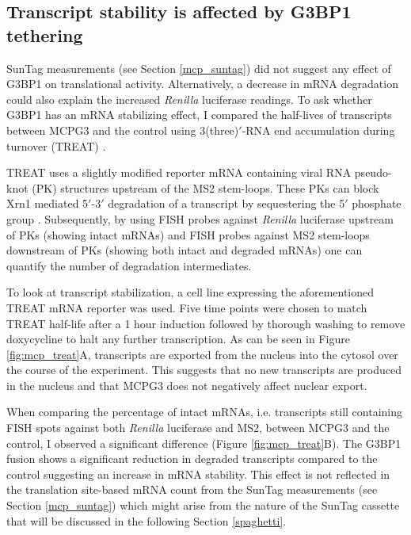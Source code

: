 \subsection{Transcript stability is affected by G3BP1 tethering} \label{mcp_treat}

SunTag measurements (see Section \ref{mcp_suntag}) did not suggest any effect of G3BP1 on translational activity.
Alternatively, a decrease in mRNA degradation could also explain the increased \textit{Renilla} luciferase readings.
To ask whether G3BP1 has an mRNA stabilizing effect, I compared the half-lives of transcripts between MCPG3 and the control using 3(three)$'$-RNA end accumulation during turnover (TREAT) \cite{horvathova_dynamics_2017}.

TREAT uses a slightly modified reporter mRNA containing viral RNA pseudo-knot (PK) structures upstream of the MS2 stem-loops.
These PKs can block Xrn1 mediated 5$'$-3$'$ degradation of a transcript by sequestering the 5$'$ phosphate group \cite{kieft_new_2015}.
Subsequently, by using FISH probes against \textit{Renilla} luciferase upstream of PKs (showing intact mRNAs) and FISH probes against MS2 stem-loops downstream of PKs (showing both intact and degraded mRNAs) one can quantify the number of degradation intermediates.

To look at transcript stabilization, a cell line expressing the aforementioned TREAT mRNA reporter was used.
Five time points were chosen to match TREAT half-life after a 1 hour induction followed by thorough washing to remove doxycycline to halt any further transcription.
As can be seen in Figure \ref{fig:mcp_treat}A, transcripts are exported from the nucleus into the cytosol over the course of the experiment.
This suggests that no new transcripts are produced in the nucleus and that MCPG3 does not negatively affect nuclear export.

When comparing the percentage of intact mRNAs, i.e. transcripts still containing FISH spots against both \textit{Renilla} luciferase and MS2, between MCPG3 and the control, I observed a significant difference (Figure \ref{fig:mcp_treat}B).
The G3BP1 fusion shows a significant reduction in degraded transcripts compared to the control suggesting an increase in mRNA stability.
This effect is not reflected in the translation site-based mRNA count from the SunTag measurements (see Section \ref{mcp_suntag}) which might arise from the nature of the SunTag cassette that will be discussed in the following Section \ref{spaghetti}.


